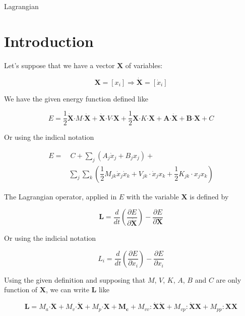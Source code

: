 \documentclass[a4paper]{article}
\newcommand{\vvector}[1]{\pmb{#1}}
\newcommand{\tensor}[1]{#1}
\newcommand{\inner}{\pmb{\cdot}}
\newcommand{\dinner}{\pmb{:}}
\begin{document}
\begin{center}
\Huge
Lagrangian
\end{center}


\section{Introduction}

Let's suppose that we have a vector $\vvector{X}$ of variables:

$$
\vvector{X} = \left[x_{i}\right] \Rightarrow 
\vvector{\dot{X}}  = \left[\dot{x}_{i}\right]
$$


We have the given energy function defined like
 
 
\begin{equation}
E = \dfrac{1}{2} \vvector{\dot{X}} \inner \tensor{M} \inner \vvector{\dot{X}} + \vvector{\dot{X}} \inner \tensor{V} \inner \vvector{X} +  
\dfrac{1}{2} \vvector{X} \inner \tensor{K} \inner \vvector{X} + \vvector{A} \inner \vvector{\dot{X}} + \vvector{B} \inner \vvector{X} + C 
\end{equation}
 
Or using the indical notation
 
\begin{align*} 
E = & \  C + \sum_{j} \left(A_{j} \dot{x}_{j} + B_{j} x_{j}\right) +  \\
& \sum_{j} \sum_{k} \left(\dfrac{1}{2}M_{jk} \dot{x}_{j} \dot{x}_{k} + V_{jk} \cdot \dot{x}_{j} x_{k} + \dfrac{1}{2}K_{jk} \cdot x_{j} x_{k}\right)
\end{align*} 
 
 
The Lagrangian operator, applied in $E$ with the variable $\vvector{X}$ is defined by 
 
\begin{equation} 
\vvector{L} = \dfrac{d}{dt}\left(\dfrac{\partial E}{\partial \vvector{\dot{X}}}\right) - \dfrac{\partial E}{\partial \vvector{X}} 
\end{equation} 
 
Or using the indicial notation
 
\begin{equation} 
L_{i} = \dfrac{d}{dt}\left(\dfrac{\partial E}{\partial \dot{x}_{i}} \right) - \dfrac{\partial E}{\partial x_{i}} 
\end{equation} 
 
Using the given definition and supposing that $M$, $V$, $K$, $A$, $B$ and $C$ are only function of $\vvector{X}$, we can write $\vvector{L}$ like


\begin{equation}
\vvector{L} = M_{a} \inner \vvector{\ddot{X}} + M_{v} \inner \vvector{\dot{X}} + M_{p} \inner \vvector{X} + \vvector{M_{c}} + M_{vv} \dinner \vvector{\dot{X}} \vvector{\dot{X}} + M_{vp} \dinner \vvector{\dot{X}} \vvector{X} + M_{pp} \dinner \vvector{X} \vvector{X}
\end{equation}
\end{document}
